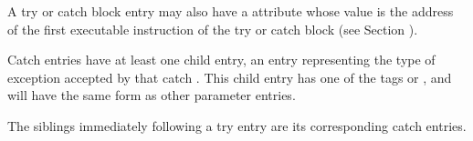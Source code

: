 \hypertarget{chap:DWATentrypcoftryblock}{}
\hypertarget{chap:DWATentrypcofcatchblock}{}
A try or catch block entry may also have 
a 
\DWATentrypc{} attribute
whose value is the address of the first executable instruction
of the try or catch block 
(see Section ).

Catch  entries have at least one child entry, 
an entry representing the type of exception accepted by
that catch . 
This child entry has one of the tags
\DWTAGformalparameter{}
or
\DWTAGunspecifiedparameters,
and will have the same form as other parameter entries.

The siblings immediately following a try  
entry are its corresponding catch  entries.

